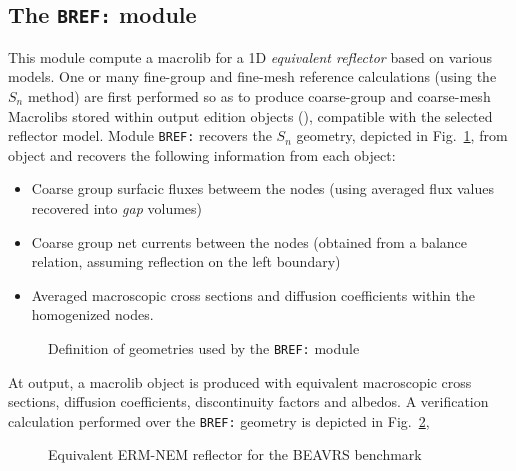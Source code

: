 \subsection{The {\tt BREF:} module}\label{sect:BREFData}

This module compute a {\sc macrolib} for a 1D {\sl equivalent reflector} based on various models. One or many fine-group and
fine-mesh reference calculations (using the $S_n$ method) are first performed so as to produce coarse-group and
coarse-mesh Macrolibs stored within output {\sc edition} objects (), compatible with the selected
reflector model. Module {\tt BREF:} recovers the $S_n$ {\sc geometry}, depicted in Fig.~\ref{fig:bref}, from object 
and recovers the following information from each  object:
\begin{itemize}
\item Coarse group surfacic fluxes betweem the nodes (using averaged flux values recovered into {\sl gap} volumes)
\item Coarse group net currents between the nodes (obtained from a balance relation, assuming reflection on the left
boundary)
\item Averaged macroscopic cross sections and diffusion coefficients within the homogenized nodes.
\end{itemize}

\begin{figure}[h!]
\begin{center} 
\epsfxsize=11cm
\centerline{ }
\parbox{14cm}{\caption{Definition of geometries used by the {\tt BREF:} module}
\label{fig:bref}} 
\end{center} 
\end{figure}

At output, a {\sc macrolib} object is produced with equivalent macroscopic cross sections, diffusion coefficients, discontinuity factors and
albedos. A verification calculation performed over the {\tt BREF:} geometry is depicted in Fig.~\ref{fig:brefVerif},

\begin{figure}[h!]
\begin{center} 
\epsfxsize=15cm
\centerline{ }
\parbox{14cm}{\caption{Equivalent ERM-NEM reflector for the BEAVRS benchmark}
\label{fig:brefVerif}} 
\end{center} 
\end{figure}

\vskip 0.02cm
\goodbreak

